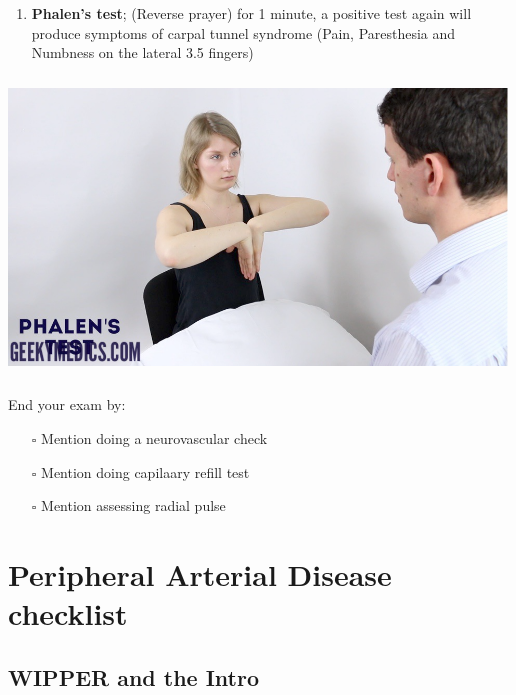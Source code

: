 \documentclass[
  13.5pt,
  a4paper,
  DIV=11,
  numbers=noendperiod]{scrreprt}
\providecommand{\tightlist}{%
  \setlength{\itemsep}{0pt}\setlength{\parskip}{0pt}}
\begin{document}
\begin{enumerate}
\def\labelenumi{\arabic{enumi})}
\setcounter{enumi}{2}
\tightlist
\item
  \textbf{Phalen's test}; (Reverse prayer) for 1 minute, a positive test
  again will produce symptoms of carpal tunnel syndrome (Pain,
  Paresthesia and Numbness on the lateral 3.5 fingers)
\end{enumerate}

\includegraphics[width=5.20833in,height=3.125in]{mss7.png}

End your exam by:

\begin{itemize}
\tightlist
\item[$\square$]
  Mention doing a neurovascular check
\item[$\square$]
  Mention doing capilaary refill test
\item[$\square$]
  Mention assessing radial pulse
\end{itemize}


\chapter{Peripheral Arterial Disease
checklist}\label{peripheral-arterial-disease-checklist}

\section{WIPPER and the Intro}\label{wipper-and-the-intro-6}
\end{document}
